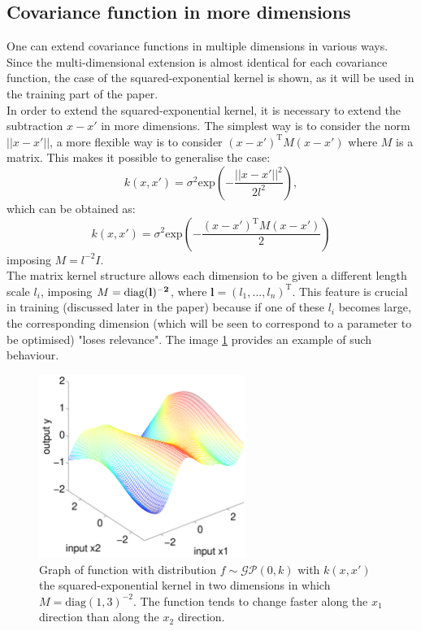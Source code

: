 \subsection{Covariance function in more dimensions}\label{multidimensionalKernel}
One can extend covariance functions in multiple dimensions in various ways. Since the multi-dimensional extension is almost identical for each covariance function, the case of the squared-exponential kernel is shown, as it will be used in the training part of the paper.\\
In order to extend the squared-exponential kernel, it is necessary to extend the subtraction $x-x'$ in more dimensions. The simplest way is to consider the norm $||x-x'||$, a more flexible way is to consider $(x-x')^\text{T}M(x-x')$ where $M$ is a matrix.
This makes it possible to generalise the case:
\[
k(x,x')=\sigma^2 \text{exp}\left( -\frac{||x-x'||^2}{2l^2} \right),
\]
which can be obtained as:
\[
k(x,x')=\sigma^2 \text{exp}\left( -\frac{(x-x')^\text{T}M(x-x')}{2} \right)
\]
imposing $M=l^{-2}I$.\\
The matrix kernel structure allows each dimension to be given a different length scale $l_i$, imposing $M=\text{diag}(\bf{l})^{-2}$, where $\mathbf{l}=(l_1,...,l_n)^\text{T}$. This feature is crucial in training (discussed later in the paper) because if one of these $l_i$ becomes large, the corresponding dimension (which will be seen to correspond to a parameter to be optimised) "loses relevance". The image \ref{multidimensional} provides an example of such behaviour.

\begin{figure}[h]
    \centering
    \includegraphics[width=0.6\textwidth]{images/Gaussian process/Multidimensional RBF.pdf}
    \caption{Graph of function with distribution $f\sim \mathcal{GP}(0,k)$ with $k(x,x')$ the squared-exponential kernel in two dimensions in which $M=\text{diag}(1,3)^{-2}$. The function tends to change faster along the $x_1$ direction than along the $x_2$ direction. \cite{murphy_machine_2012}}
    \label{multidimensional}
\end{figure}




